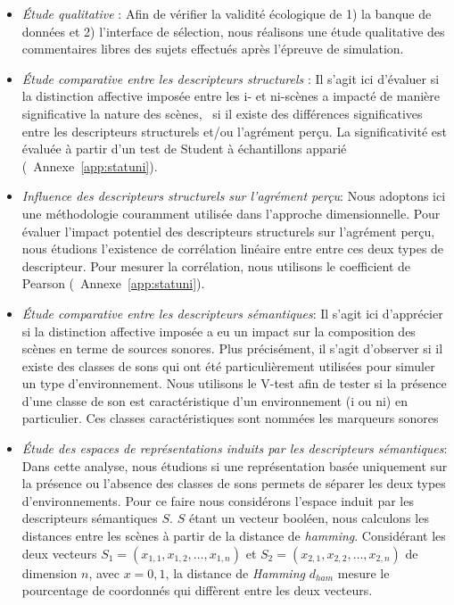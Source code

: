 \begin{itemize}
\item \emph{Étude qualitative} : Afin de vérifier la validité écologique de 1) la banque de données et 2) l'interface de sélection, nous réalisons une étude qualitative des commentaires libres des sujets effectués après l'épreuve de simulation.
\item \emph{Étude comparative entre les descripteurs structurels} : Il s'agit ici d'évaluer si la distinction affective imposée entre les i- et ni-scènes a impacté de manière significative la nature des scènes, \ie~si il existe des différences significatives entre les descripteurs structurels et/ou l'agrément perçu. La significativité est évaluée à partir d'un test de Student à échantillons apparié (\Cf~Annexe~\ref{app:statuni}).
\item \emph{Influence des descripteurs structurels sur l'agrément perçu}: Nous adoptons ici une méthodologie couramment utilisée dans l'approche dimensionnelle. Pour évaluer l'impact potentiel des descripteurs structurels sur l'agrément perçu, nous étudions l'existence de corrélation linéaire entre entre ces deux types de descripteur. Pour mesurer la corrélation, nous utilisons le coefficient de Pearson (\Cf~Annexe~\ref{app:statuni}).
\item \emph{Étude comparative entre les descripteurs sémantiques}: Il s'agit ici d'apprécier si la distinction affective imposée a eu un impact sur la composition des scènes en terme de sources sonores. Plus précisément, il s'agit d'observer si il existe des classes de sons qui ont été particulièrement utilisées pour simuler un type d'environnement. Nous utilisons le V-test afin de tester si la présence d'une classe de son est caractéristique d'un environnement (i ou ni) en particulier. Ces classes caractéristiques sont nommées les marqueurs sonores
\item \emph{Étude des espaces de représentations induits par les descripteurs sémantiques}: Dans cette analyse, nous étudions si une représentation basée uniquement sur la présence ou l'absence des classes de sons permets de séparer les deux types d'environnements. Pour ce faire nous considérons l'espace induit par les descripteurs sémantiques $S$. $S$ étant un vecteur booléen, nous calculons les distances entre les scènes à partir de la distance de \emph{hamming}. Considérant les deux vecteurs $S_1=(x_{1,1},x_{1,2},\ldots,x_{1,n})$ et $S_2=(x_{2,1},x_{2,2},\ldots,x_{2,n})$ de dimension $n$, avec $x={0,1}$, la distance de \emph{Hamming} $d_{ham}$ mesure le pourcentage de coordonnés qui diffèrent entre les deux vecteurs. 



\end{itemize}
